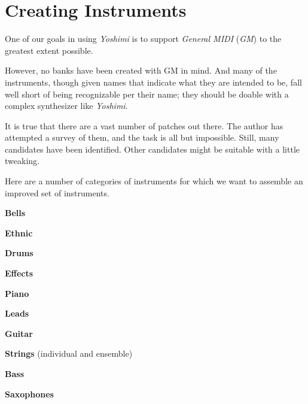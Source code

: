%
%
%

\section{Creating Instruments}
\label{sec:cookbook_instruments}

   One of our goals in using \textsl{Yoshimi} is to support
   \textsl{General MIDI} (\textsl{GM})
   to the greatest extent possible.

   However, no banks have been created with GM in mind.  And many of the
   instruments, though given names that indicate what they are intended to
   be, fall well short of being recognizable per their name; they should be
   doable with a complex synthesizer like \textsl{Yoshimi}.
  
   It is true that there are a vast number of patches out there.  The author
   has attempted a survey of them, and the task is all but impossible.
   Still, many candidates have been identified.  Other candidates might be
   suitable with a little tweaking.

   Here are a number of categories of instruments for which we want to
   assemble an improved set of instruments.

   \begin{enumber}
      \item \textbf{Bells}
      \item \textbf{Ethnic}
      \item \textbf{Drums}
      \item \textbf{Effects}
      \item \textbf{Piano}
      \item \textbf{Leads}
      \item \textbf{Guitar}
      \item \textbf{Strings} (individual and ensemble)
      \item \textbf{Bass}
      \item \textbf{Saxophones}
   \end{enumber}

